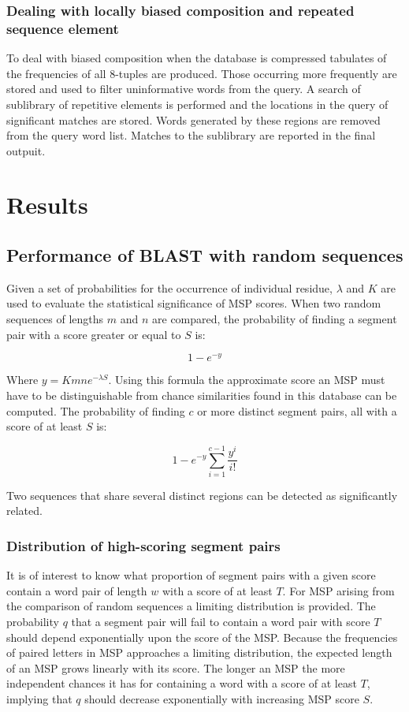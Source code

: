 		\subsubsection{Dealing with locally biased composition and repeated sequence element}
		To deal with biased composition when the database is compressed tabulates of the frequencies of all $8$-tuples are produced.
		Those occurring more frequently are stored and used to filter uninformative words from the query.
		A search of sublibrary of repetitive elements is performed and the locations in the query of significant matches are stored.
		Words generated by these regions are removed from the query word list.
		Matches to the sublibrary are reported in the final outpuit.

\section{Results}

	\subsection{Performance of BLAST with random sequences}
	Given a set of probabilities for the occurrence of individual residue, $\lambda$ and $K$ are used to evaluate the statistical significance of MSP scores.
	When two random sequences of lengths $m$ and $n$ are compared, the probability of finding a segment pair with a score greater or equal to $S$ is:

	$$1-e^{-y}$$

	Where $y = Kmne^{-\lambda S}$.
	Using this formula the approximate score an MSP must have to be distinguishable from chance similarities found in this database can be computed.
	The probability of finding $c$ or more distinct segment pairs, all with a score of at least $S$ is:

	$$1-e^{-y}\sum\limits_{i=1}^{c-1}\frac{y^i}{i!}$$

	Two sequences that share several distinct regions can be detected as significantly related.

		\subsubsection{Distribution of high-scoring segment pairs}
		It is of interest to know what proportion of segment pairs with a given score contain a word pair of length $w$ with a score of at least $T$.
		For MSP arising from the comparison of random sequences a limiting distribution is provided.
		The probability $q$ that a segment pair will fail to contain a word pair with score $T$ should depend exponentially upon the score of the MSP.
		Because the frequencies of paired letters in MSP approaches a limiting distribution, the expected length of an MSP grows linearly with its score.
		The longer an MSP the more independent chances it has for containing a word with a score of at least $T$, implying that $q$ should decrease exponentially with increasing MSP score $S$.

